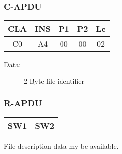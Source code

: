 \documentclass[a4paper,oneside]{article}
\begin{document}
\subsubsection*{C-APDU}

\begin{tabular}{|c|c|c|c|c|} \hline
CLA & INS & P1 & P2 & Lc \\ \hline \hline
C0 & A4 & 00 & 00 & 02 \\ \hline
\end{tabular}

\begin{description}
\item[Data:] 2-Byte file identifier
\end{description}

\subsubsection*{R-APDU}

\begin{tabular}{|c|c|} \hline
SW1 & SW2 \\ \hline
\end{tabular}

File description data my be available.
\end{document}
